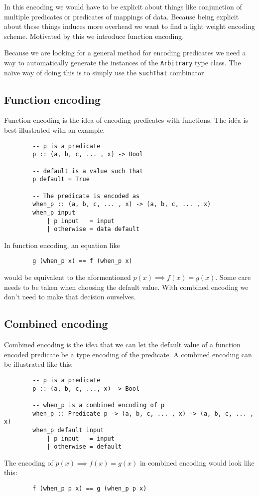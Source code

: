         In this encoding we would have to be explicit about things like conjunction
        of multiple predicates or predicates of mappings of data.
        Because being explicit about these things induces more overhead
        we want to find a light weight encoding scheme. Motivated by this
        we introduce function encoding.

        Because we are looking for a general method for encoding predicates we need
        a way to automatically generate the instances of the \texttt{Arbitrary} type class.
        The naïve way of doing this is to simply use the \texttt{suchThat}%
        combinator. 

    \subsection{Function encoding}

        Function encoding is the idea of encoding 
        predicates with functions. The idéa is best
        illustrated with an example.
        \begin{verbatim}
        -- p is a predicate
        p :: (a, b, c, ... , x) -> Bool

        -- default is a value such that
        p default = True

        -- The predicate is encoded as
        when_p :: (a, b, c, ... , x) -> (a, b, c, ... , x)
        when_p input
            | p input   = input
            | otherwise = data default
        \end{verbatim}
        In function encoding, an equation like
        \begin{verbatim}
        g (when_p x) == f (when_p x)
        \end{verbatim}
        would be equivalent to the aformentioned $p(x) \implies f(x) = g(x)$.
        Some care needs to be taken when choosing the default value.
        With combined encoding we don't need to make that decision ourselves.

     \subsection{Combined encoding}\label{combined_encoding}
        
        Combined encoding is the idea that we can let the
        default value of a function encoded predicate be a type
        encoding of the predicate. A combined encoding can be illustrated
        like this:
        \begin{verbatim}
        -- p is a predicate
        p :: (a, b, c, ..., x) -> Bool  

        -- when_p is a combined encoding of p
        when_p :: Predicate p -> (a, b, c, ... , x) -> (a, b, c, ... , x)
        when_p default input
            | p input   = input
            | otherwise = default
        \end{verbatim}
        The encoding of $p(x) \implies f(x) = g(x)$ in combined encoding would look like
        this:
        \begin{verbatim}
        f (when_p p x) == g (when_p p x)
        \end{verbatim}

